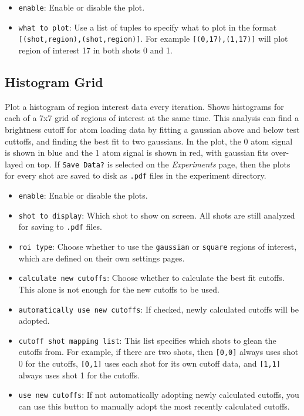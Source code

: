 \documentclass[pdftex,11pt,letterpaper]{article}
\begin{document}
\begin{itemize}
\item \texttt{enable}:  Enable or disable the plot.
\item \texttt{what to plot}:  Use a list of tuples to specify what to plot in the format \texttt{[(shot,region),(shot,region)]}.  For example \texttt{[(0,17),(1,17)]} will plot region of interest 17 in both shots 0 and 1.
\end{itemize}

\subsection{Histogram Grid}

Plot a histogram of region interest data every iteration.  Shows histograms for each of a 7x7 grid of regions of interest at the same time.  This analysis can find a brightness cutoff for atom loading data by fitting a gaussian above and below test cuttoffs, and finding the best fit to two gaussians.  In the plot, the 0 atom signal is shown in blue and the 1 atom signal is shown in red, with gaussian fits over-layed on top.  If \texttt{Save Data?} is selected on the \textit{Experiments} page, then the plots for every shot are saved to disk as \texttt{.pdf} files in the experiment directory.

\begin{itemize}
\item \texttt{enable}:  Enable or disable the plots.
\item \texttt{shot to display}:  Which shot to show on screen.  All shots are still analyzed for saving to \texttt{.pdf} files.
\item \texttt{roi type}:  Choose whether to use the \texttt{gaussian} or \texttt{square} regions of interest, which are defined on their own settings pages.
\item \texttt{calculate new cutoffs}:  Choose whether to calculate the best fit cutoffs.  This alone is not enough for the new cutoffs to be used.
\item \texttt{automatically use new cutoffs}:  If checked, newly calculated cutoffs will be adopted.
\item \texttt{cutoff shot mapping list}:  This list specifies which shots to glean the cutoffs from.  For example, if there are two shots, then \texttt{[0,0]} always uses shot 0 for the cutoffs, \texttt{[0,1]} uses each shot for its own cutoff data, and \texttt{[1,1]} always uses shot 1 for the cutoffs.
\item \texttt{use new cutoffs}:  If not automatically adopting newly calculated cutoffs, you can use this button to manually adopt the most recently calculated cutoffs. 
\end{itemize}
\end{document}
